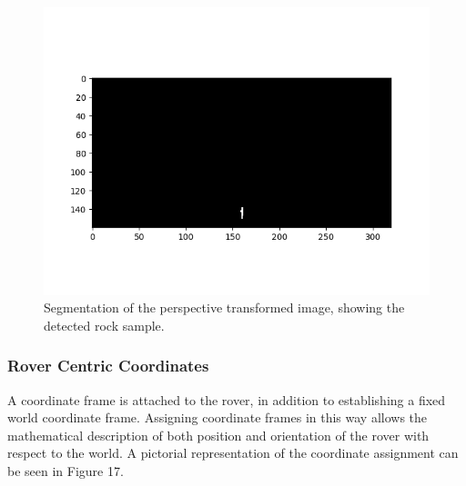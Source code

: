 \documentclass[a4paper]{article}
\begin{document}
\vspace{-0.85cm}

\begin{figure}[h]
\centering
\includegraphics[scale=0.55]{image17}
\vspace{-1cm}
\caption{Segmentation of the perspective transformed image, showing the detected rock sample.}
\end{figure}

\newpage

\subsubsection{Rover Centric Coordinates}
A coordinate frame is attached to the rover, in addition to establishing a fixed world coordinate frame. Assigning coordinate frames in this way allows the mathematical description of both position and orientation of the rover with respect to the world. A pictorial representation of the coordinate assignment can be seen in Figure 17.\\

\vspace{1cm}
\end{document}
